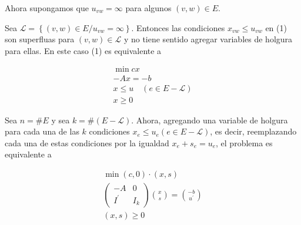 \documentclass[10pt]{article}
\begin{document}
Ahora supongamos que $u_{v w}=\infty$ para algunos $(v, w) \in E$.

Sea $\mathcal{L}=\left\{(v, w) \in E / u_{v w}=\infty\right\}$. Entonces las condiciones $x_{v w} \leq u_{v w}$ en (1) son superfluas para $(v, w) \in \mathcal{L}$ y no tiene sentido agregar variables de holgura para ellas. En este caso (1) es equivalente a

$$
\begin{gathered}
\min c x \\
-A x=-b \\
x \leq u \quad(e \in E-\mathcal{L}) \\
x \geq 0
\end{gathered}
$$

Sea $n=\# E$ y sea $k=\#(E-\mathcal{L})$. Ahora, agregando una variable de holgura para cada una de las $k$ condiciones $x_{e} \leq u_{e}(e \in E-\mathcal{L})$, es decir, reemplazando cada una de estas condiciones por la igualdad $x_{e}+s_{e}=u_{e}$, el problema es equivalente a


\begin{gather*}
\min (c, 0) \cdot(x, s) \\
\left(\begin{array}{cc}
-A & 0 \\
I^{\prime} & I_{k}
\end{array}\right)\binom{x}{s}=\binom{-b}{u^{\prime}}  \tag{$\prime$}\\
(x, s) \geq 0
\end{gather*}
\end{document}
